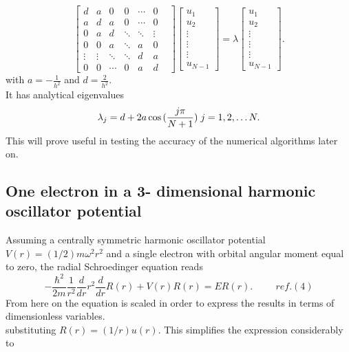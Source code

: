\documentclass[10pt,a4paper]{article}
\begin{document}
\begin{equation*}
\begin{bmatrix}
d & a &0  &0  &\cdots  & 0\\ 
 a&  d& a & 0 & \cdots &0 \\ 
 0&  a&  d& \ddots  &\ddots  &\vdots \\ 
 0& 0 & a &  \ddots& a &0 \\ 
 \vdots&\vdots  &\ddots  &\ddots  &  d&a \\ 
 0& 0 & \cdots & 0 & a &d& 
\end{bmatrix}
  \begin{bmatrix} u_{1} \\
                                                              u_{2} \\
                                                              \vdots\\ \vdots\\ \vdots\\
                                                              u_{N-1}
             \end{bmatrix}=\lambda \begin{bmatrix} u_{1} \\
                                                              u_{2} \\
                                                              \vdots\\ \vdots\\ \vdots\\
                                                              u_{N-1}
             \end{bmatrix}.  
\end{equation*}
with $a = -\frac{1}{h^2}$ and $d=\frac{2}{h^2}$.\\It has analytical eigenvalues
\begin{equation*}
\lambda_j = d+2a\cos{(\frac{j\pi}{N+1})} \hspace{0.1cm} j=1,2,\dots N.
\end{equation*}
This will prove useful in testing the accuracy of the numerical algorithms later on.
\subsection{One electron in a 3- dimensional harmonic oscillator potential}
Assuming a centrally symmetric harmonic oscillator potential $V(r) = (1/2)m\omega^2r^2$ and a single electron with orbital angular moment equal to zero, the radial Schroedinger equation reads
\begin{equation*}
-\frac{\hbar^2}{2 m} \frac{1}{r^2} \frac{d}{dr} r^2\frac{d}{dr}R(r)+ V(r) R(r) = E R(r). \hspace{1cm} ref.(4)
\end{equation*}
From here on the equation is scaled in order to express the results in terms of dimensionless variables.\\
substituting $R(r) = (1/r) u(r)$. This simplifies the expression considerably to
\end{document}
